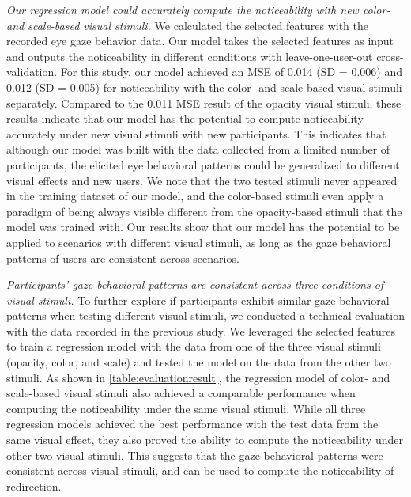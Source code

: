 \textit{Our regression model could accurately compute the noticeability with new color- and scale-based visual stimuli.}
We calculated the selected features with the recorded eye gaze behavior data.
Our model takes the selected features as input and outputs the noticeability in different conditions with leave-one-user-out cross-validation.
For this study, our model achieved an MSE of 0.014 (SD = 0.006) and 0.012 (SD = 0.005) for noticeability with the color- and scale-based visual stimuli separately.
Compared to the 0.011 MSE result of the opacity visual stimuli, these results indicate that our model has the potential to compute noticeability accurately under new visual stimuli with new participants.
This indicates that although our model was built with the data collected from a limited number of participants, the elicited eye behavioral patterns could be generalized to different visual effects and new users.
We note that the two tested stimuli never appeared in the training dataset of our model, and the color-based stimuli even apply a paradigm of being always visible different from the opacity-based stimuli that the model was trained with.
Our results show that our model has the potential to be applied to scenarios with different visual stimuli, as long as the gaze behavioral patterns of users are consistent across scenarios.

\textit{Participants' gaze behavioral patterns are consistent across three conditions of visual stimuli.}
To further explore if participants exhibit similar gaze behavioral patterns when testing different visual stimuli, we conducted a technical evaluation with the data recorded in the previous study.
We leveraged the selected features to train a regression model with the data from one of the three visual stimuli (opacity, color, and scale) and tested the model on the data from the other two stimuli.
As shown in \autoref{table:evaluationresult}, the regression model of color- and scale-based visual stimuli also achieved a comparable performance when computing the noticeability under the same visual stimuli.
While all three regression models achieved the best performance with the test data from the same visual effect, they also proved the ability to compute the noticeability under other two visual stimuli.
This suggests that the gaze behavioral patterns were consistent across visual stimuli, and can be used to compute the noticeability of redirection.


